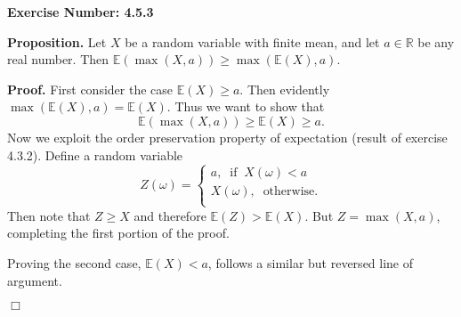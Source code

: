 \documentclass{article}
\begin{document}
\noindent \textbf{Exercise Number: 4.5.3}  %

\medskip 

\noindent \textbf{Proposition.} Let $X$ be a random variable with finite mean, and let $a \in \mathbb{R}$ be any real number. Then $\mathbb{E}(\max(X,a)) \geq \max(\mathbb{E}(X), a)$. 

\bigskip

\noindent \textbf{Proof.} First consider the case $\mathbb{E}(X) \geq a$. Then evidently $\max(\mathbb{E}(X), a) = \mathbb{E}(X)$. Thus we want to show that \[\mathbb{E}(\max(X,a)) \geq \mathbb{E}(X) \geq a.\] Now we exploit the order preservation property of expectation (result of exercise 4.3.2). Define a random variable \[Z(\omega) = \begin{cases} a, \;\; \text{if} \;\; X(\omega) < a \\ X(\omega), \; \;\text{otherwise}.\\ \end{cases}\] Then note that $Z \geq X$ and therefore $\mathbb{E}(Z) > \mathbb{E}(X)$. But $Z = \max(X,a)$, completing the first
portion of the proof. 

\medskip

\noindent Proving the second case, $\mathbb{E}(X) < a$, follows a similar but reversed line of argument. 

\hfill $\Box$
\end{document}
